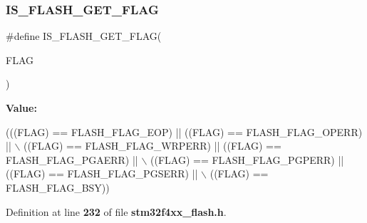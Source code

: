 \subsubsection{I\+S\+\_\+\+F\+L\+A\+S\+H\+\_\+\+G\+E\+T\+\_\+\+F\+L\+AG}
{\footnotesize\ttfamily \#define I\+S\+\_\+\+F\+L\+A\+S\+H\+\_\+\+G\+E\+T\+\_\+\+F\+L\+AG(\begin{DoxyParamCaption}\item[{}]{F\+L\+AG }\end{DoxyParamCaption})}

{\bfseries Value\+:}
\begin{DoxyCode}
(((FLAG) == FLASH_FLAG_EOP) || ((FLAG) == FLASH_FLAG_OPERR) || \(\backslash\)
                                  ((FLAG) == FLASH_FLAG_WRPERR) || ((FLAG) == 
      FLASH_FLAG_PGAERR) || \(\backslash\)
                                  ((FLAG) == FLASH_FLAG_PGPERR) || ((FLAG) == 
      FLASH_FLAG_PGSERR) || \(\backslash\)
                                  ((FLAG) == FLASH_FLAG_BSY))
\end{DoxyCode}


Definition at line \textbf{ 232} of file \textbf{ stm32f4xx\+\_\+flash.\+h}.

